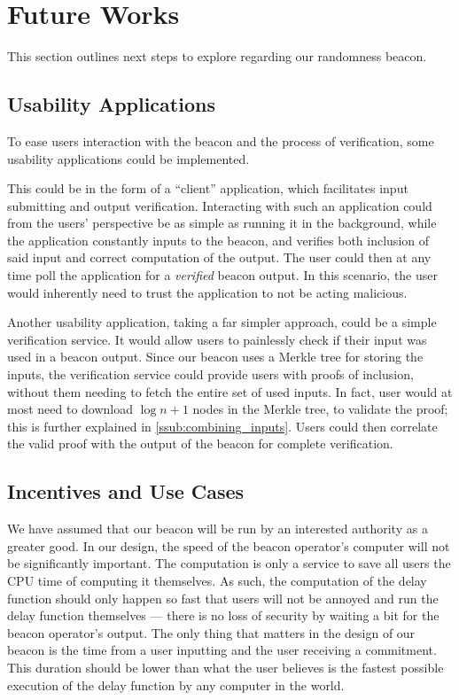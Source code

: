 \section{Future Works}%
\label{sec:future_works}
This section outlines next steps to explore regarding our randomness beacon.

\subsection{Usability Applications}%
\label{sub:usability_applications}
To ease users interaction with the beacon and the process of verification, some usability applications could be implemented.

This could be in the form of a \enquote{client} application, which facilitates input submitting and output verification.
Interacting with such an application could from the users' perspective be as simple as running it in the background, while the application constantly inputs to the beacon, and verifies both inclusion of said input and correct computation of the output.
The user could then at any time poll the application for a \emph{verified} beacon output.
In this scenario, the user would inherently need to trust the application to not be acting malicious.

Another usability application, taking a far simpler approach, could be a simple verification service.
It would allow users to painlessly check if their input was used in a beacon output.
Since our beacon uses a Merkle tree for storing the inputs, the verification service could provide users with proofs of inclusion, without them needing to fetch the entire set of used inputs.
In fact, user would at most need to download $\log{n} + 1$ nodes in the Merkle tree, to validate the proof; this is further explained in \vref{ssub:combining_inputs}.
Users could then correlate the valid proof with the output of the beacon for complete verification.

\subsection{Incentives and Use Cases}
We have assumed that our beacon will be run by an interested authority as a greater good. In our design, the speed of the beacon operator's computer will not be significantly important. The computation is only a service to save all users the CPU time of computing it themselves. As such, the computation of the delay function should only happen so fast that users will not be annoyed and run the delay function themselves --- there is no loss of security by waiting a bit for the beacon operator's output. The only thing that matters in the design of our beacon is the time from a user inputting and the user receiving a commitment. This duration should be lower than what the user believes is the fastest possible execution of the delay function by any computer in the world.

